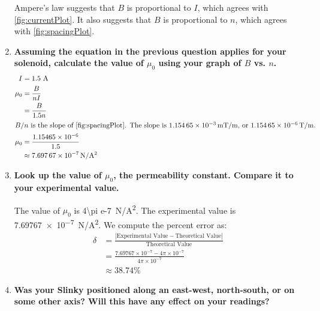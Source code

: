 \documentclass[article, 12pt]{article}
\begin{document}
\begin{enumerate}[1.]
         Ampere's law suggests that $B$ is proportional to $I$, which agrees with \autoref{fig:currentPlot}. It also suggests that $B$ is proportional to $n$, which agrees with \autoref{fig:spacingPlot}.
         \item \textbf{Assuming the equation in the previous question applies for your solenoid, calculate the value
         of $\mu_0$ using your graph of $B$ vs. $n$.}
         \begin{align}
            I &= 1.5 \text{ A} \nonumber \\
            \mu_0 &= \frac{B}{nI} \nonumber \\
                  &= \frac{B}{1.5n} \nonumber \\
            \intertext{$B/n$ is the slope of \autoref{fig:spacingPlot}. The slope is \SI{1.15465e-3}{\milli\tesla/\meter}, or \SI{1.15465e-6}{\tesla/\meter}.}
            \mu_0 &= \frac{1.15465 \times 10^{-6}}{1.5} \nonumber \\
                  &\approx \text{\SI{7.69767e-7}{\newton/\ampere^2}}
         \end{align}
         \item \textbf{Look up the value of $\mu_0$, the permeability constant. Compare it to your experimental value.}
         
         The value of $\mu_0$ is \SI{4\pi e-7}{\newton/\ampere^2}. The experimental value is \SI{7.69767e-7}{\newton/\ampere^2}. We compute the percent error as:
         \begin{align}
            \delta &= \frac{|\text{Experimental Value} - \text{Theoretical Value}|}{\text{Theoretical Value}} \nonumber \\
                  &= \frac{7.69767 \times 10^{-7} - 4\pi \times 10^{-7}}{4\pi \times 10^{-7}} \nonumber \\
                  &\approx 38.74\%
         \end{align}
         \item \textbf{Was your Slinky positioned along an east-west, north-south, or on some other axis? Will this
         have any effect on your readings?}
     \end{enumerate}
     
\end{document}
